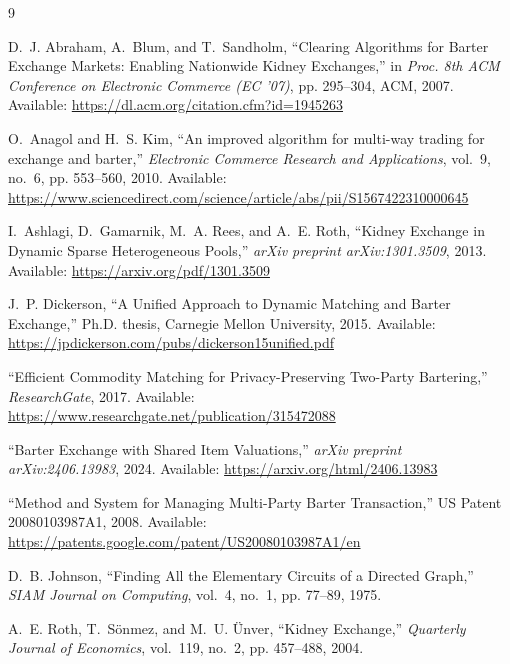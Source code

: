 \begin{thebibliography}{9}

D.~J. Abraham, A.~Blum, and T.~Sandholm,
``Clearing Algorithms for Barter Exchange Markets: Enabling Nationwide Kidney Exchanges,''
in \textit{Proc. 8th ACM Conference on Electronic Commerce (EC '07)},
pp. 295--304, ACM, 2007.
Available: \url{https://dl.acm.org/citation.cfm?id=1945263}

O.~Anagol and H.~S. Kim,
``An improved algorithm for multi-way trading for exchange and barter,''
\textit{Electronic Commerce Research and Applications},
vol.~9, no.~6, pp. 553--560, 2010.
Available: \url{https://www.sciencedirect.com/science/article/abs/pii/S1567422310000645}

I.~Ashlagi, D.~Gamarnik, M.~A. Rees, and A.~E. Roth,
``Kidney Exchange in Dynamic Sparse Heterogeneous Pools,''
\textit{arXiv preprint arXiv:1301.3509}, 2013.
Available: \url{https://arxiv.org/pdf/1301.3509}

J.~P. Dickerson,
``A Unified Approach to Dynamic Matching and Barter Exchange,''
Ph.D. thesis, Carnegie Mellon University, 2015.
Available: \url{https://jpdickerson.com/pubs/dickerson15unified.pdf}

``Efficient Commodity Matching for Privacy-Preserving Two-Party Bartering,''
\textit{ResearchGate}, 2017.
Available: \url{https://www.researchgate.net/publication/315472088}

``Barter Exchange with Shared Item Valuations,''
\textit{arXiv preprint arXiv:2406.13983}, 2024.
Available: \url{https://arxiv.org/html/2406.13983}

``Method and System for Managing Multi-Party Barter Transaction,''
US Patent 20080103987A1, 2008.
Available: \url{https://patents.google.com/patent/US20080103987A1/en}

D.~B. Johnson,
``Finding All the Elementary Circuits of a Directed Graph,''
\textit{SIAM Journal on Computing},
vol.~4, no.~1, pp. 77--89, 1975.

A.~E. Roth, T.~S\"{o}nmez, and M.~U. \"{U}nver,
``Kidney Exchange,''
\textit{Quarterly Journal of Economics},
vol.~119, no.~2, pp. 457--488, 2004.

\end{thebibliography}